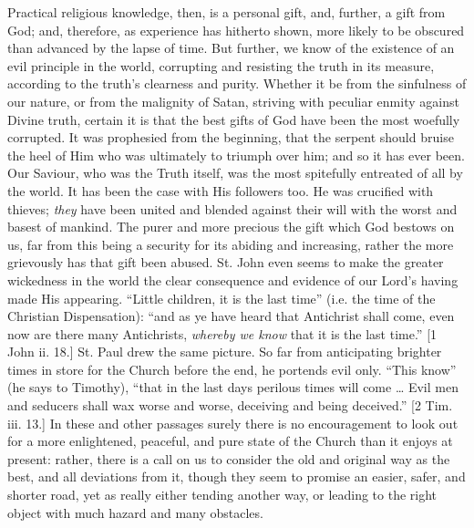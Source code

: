 Practical religious knowledge, then, is a personal gift, and,
further, a gift from God; and, therefore, as experience has hitherto
shown, more likely to be obscured than advanced by the lapse of time.
But further, we know of the existence of an evil principle in the
world, corrupting and resisting the truth in its measure, according to
the truth's clearness and purity. Whether it be from the sinfulness of
our nature, or from the malignity of Satan, striving with peculiar
enmity against Divine truth, certain it is that the best gifts of God
have been the most woefully corrupted. It was prophesied from the
beginning, that the serpent should bruise the heel of Him who was
ultimately to triumph over him; and so it has ever been. Our Saviour,
who was the Truth itself, was the most spitefully entreated of all by
the world. It has been the case with His followers too. He was
crucified with thieves; \emph{they} have been united and blended
against their will with the worst and basest of mankind. The purer and
more precious the gift which God bestows on us, far from this being a
security for its abiding and increasing, rather the more grievously
has that gift been abused. St. John even seems to make the greater
wickedness in the world the clear consequence and evidence of our
Lord's having made His appearing. ``Little children, it is the
last time'' (i.e. the time of the Christian Dispensation):
``and as ye have heard that Antichrist shall come, even now are
there many Antichrists, \emph{whereby we know} that it is the last
time.'' [1 John ii. 18.] St. Paul drew the same picture. So far
from anticipating brighter times in store for the Church before the
end, he portends evil only. ``This know'' (he says to
Timothy), ``that in the last days perilous times will come …
Evil men and seducers shall wax worse and worse, deceiving and being
deceived.'' [2 Tim. iii. 13.] In these and other passages surely
there is no encouragement to look out for a more enlightened,
peaceful, and pure state of the Church than it enjoys at present:
rather, there is a call on us to consider the old and original way as
the best, and all deviations from it, though they seem to promise an
easier, safer, and shorter road, yet as really either tending another
way, or leading to the right object with much hazard and many
obstacles.

